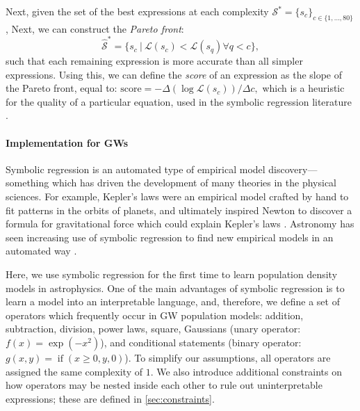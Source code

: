 \documentclass[nohyperref]{article}
\theoremstyle{plain}
\theoremstyle{definition}
\theoremstyle{remark}
\begin{document}
Next, given the set of the best expressions at each complexity $\mathcal{S}^\ast = \{s_c\}_{c\in\{1,\ldots,80\}}$,
Next, we can construct the \textit{Pareto front}:
\begin{equation}
    \hat{\mathcal{S}}^\ast = \{s_c \ |\ \mathcal{L}(s_c) < \mathcal{L}(s_q) \forall q < c \},
\end{equation}
such that each remaining expression is more accurate than all simpler expressions.
Using this, we can define the \textit{score} of an expression as the slope of the Pareto front, equal to: $\text{score} = -\Delta(\log \mathcal{L}(s_c))/\Delta c,$
which is a heuristic for the quality of a particular equation, used in the symbolic regression literature \citep[see, e.g.,][]{schmidtDistillingFreeFormNatural2009,cranmerDiscoveringSymbolicModels2020}.


\paragraph{Implementation for GWs}
Symbolic regression is an automated type of empirical model discovery---something which has driven the development of many theories in the physical sciences.
For example, Kepler's laws were an empirical model crafted by hand to fit patterns in the orbits of planets, and ultimately inspired Newton to discover a formula for gravitational force which could explain Kepler's laws \citep[see][for a review of this history]{hawkingShouldersGiantsGreat2004}.
Astronomy has seen increasing use of symbolic regression to find new empirical models in an automated way \citep[e.g.,][]{grahamMachineassistedDiscoveryRelationships2013,cranmerDiscoveringSymbolicModels2020,wadekarModelingAssemblyBias2020,delgadoModelingGalaxyhaloConnection2021,cranmerHistogramPoolingOperators2021,shaoFindingUniversalRelations2021}.

Here, we use symbolic regression for the first time to learn population density models in astrophysics.
One of the main advantages of symbolic regression is to learn a model into an interpretable language, and, therefore, we define a set of operators which frequently occur in GW population models: addition, subtraction, division, power laws, square, Gaussians (unary operator: $f(x)=\exp(-x^2)$), and conditional statements (binary operator: $g(x, y)=\operatorname{if}(x \geq 0, y, 0)$). 
To simplify our assumptions, all operators are assigned the same complexity of $1$.
We also introduce additional constraints on how operators may be nested inside each other to rule out uninterpretable expressions; these are defined in \cref{sec:constraints}.
\end{document}
